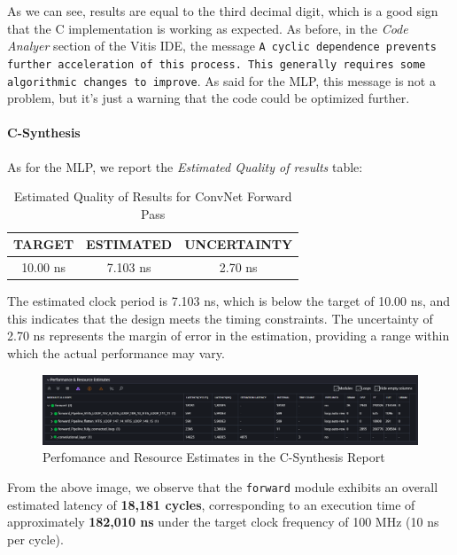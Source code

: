 \documentclass{article}
\begin{document}
As we can see, results are equal to the third decimal digit, which is a good sign that the C implementation is working as expected. As before, in the \textit{Code Analyer} section of the Vitis IDE, the message \texttt{A cyclic dependence prevents further acceleration of this process. This generally requires some algorithmic changes to improve}. As said for the MLP, this message is not a problem, but it's just a warning that the code could be optimized further.

\paragraph{C-Synthesis}
As for the MLP, we report the \textit{Estimated Quality of results} table:

\begin{table}[H]
    \centering
    \begin{tabular}{|c|c|c|}
        \hline
        \textbf{TARGET} & \textbf{ESTIMATED} & \textbf{UNCERTAINTY} \\
        \hline
        10.00 ns & 7.103 ns & 2.70 ns \\
        \hline
    \end{tabular}
    \caption{\centering Estimated Quality of Results for ConvNet Forward Pass}
    \label{tab:convnet-quality}
\end{table}

The estimated clock period is 7.103 ns, which is below the target of 10.00 ns, and this indicates that the design meets the timing constraints. The uncertainty of 2.70 ns represents the margin of error in the estimation, providing a range within which the actual performance may vary.

\begin{figure}[H]
    \centering
    \includegraphics[width=1\textwidth]{./assets/ConvNet/c-synthesis-performanceandresourceestimates.png}
    \caption{Perfomance and Resource Estimates in the C-Synthesis Report}
    \label{fig:convnet-c-synthesis-performance-resources}
\end{figure}

From the above image, we observe that the \texttt{forward} module exhibits an overall estimated latency of \textbf{18,181 cycles}, corresponding to an execution time of approximately \textbf{182,010 ns} under the target clock frequency of 100 MHz (10 ns per cycle).
\end{document}
